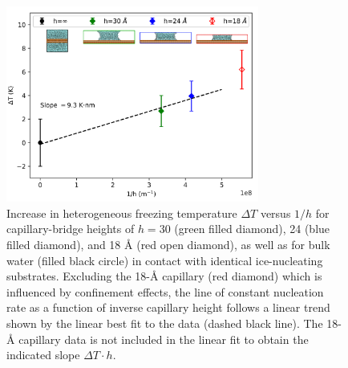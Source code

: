 \documentclass[journal abbreviation, manuscript]{copernicus}
\begin{document}
\begin{figure}[t]
\includegraphics[width=8.3cm]{figures/TvH_inset.png}
\caption{Increase in heterogeneous freezing temperature $\Delta T$ versus $1/h$ for capillary-bridge heights of $h = 30$ (green filled diamond), 24 (blue filled diamond), and 18 \AA{} (red open diamond), as well as for bulk water (filled black circle) in contact with identical ice-nucleating substrates. Excluding the 18-\AA{} capillary (red diamond) which is influenced by confinement effects, the line of constant nucleation rate as a function of inverse capillary height follows a linear trend shown by the linear best fit to the data (dashed black line). The 18-\AA{} capillary data is not included in the linear fit to obtain the indicated slope $\Delta T \cdot h$.}
    \label{fig:capillary}
\end{figure}



\end{document}
